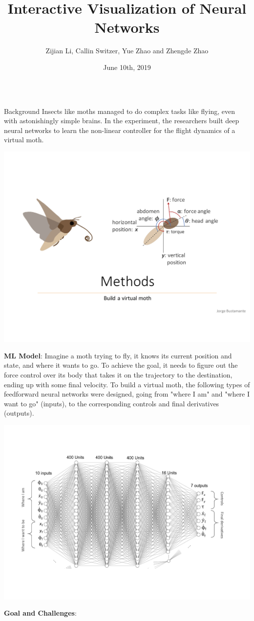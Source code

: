 \documentclass[final,hyperref={pdfpagelabels=false}]{beamer}
\title[NNV]{Interactive Visualization of Neural Networks}
\author{Zijian Li, Callin Switzer, Yue Zhao and Zhengde Zhao}
\institute{University of Washington}
\date{June 10th, 2019}
\begin{document}
  \begin{frame}{}

    \begin{columns}[t]
      \begin{column}{.3\linewidth}
        \begin{block}{Background}
 \noindent       Insects like moths managed to do complex tasks like flying, even with astonishingly simple brains. In the experiment, the researchers built deep neural networks to learn the non-linear controller for the flight dynamics of a virtual moth.
 \begin{center}
          \includegraphics[scale=0.9]{s1.pdf}
  \end{center}         
   \textbf{ML Model}: Imagine a moth trying to fly, it knows its current position and state, and where it wants to go. To achieve the goal, it needs to figure out the force control over its body that takes it on the trajectory to the destination, ending up with some final velocity. To build a virtual moth, the following types of feedforward neural networks were designed, going from "where I am" and "where I want to go" (inputs), to the corresponding controls and final derivatives (outputs).
\begin{center}
\includegraphics[scale=1]{s2.pdf}
\end{center}         
\textbf{Goal and Challenges}:  \\


\end{block}
\end{column}
\end{columns}
\end{frame}
\end{document}
